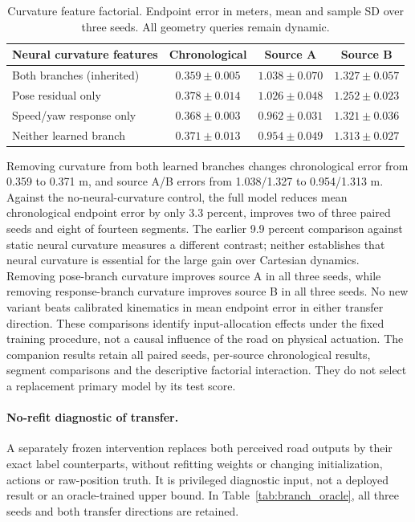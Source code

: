 \documentclass[preprint,12pt]{elsarticle}
\begin{document}
\begin{table}[htbp]
\centering\small
\caption{Curvature feature factorial. Endpoint error in meters, mean and sample SD over three seeds. All geometry queries remain dynamic.}
\label{tab:branch_factorial}
\begin{tabular}{lccc}\toprule
Neural curvature features & Chronological & Source A & Source B \\\midrule
Both branches (inherited) & $0.359 \pm 0.005$ & $1.038 \pm 0.070$ & $1.327 \pm 0.057$ \\
Pose residual only & $0.378 \pm 0.014$ & $1.026 \pm 0.048$ & $1.252 \pm 0.023$ \\
Speed/yaw response only & $0.368 \pm 0.003$ & $0.962 \pm 0.031$ & $1.321 \pm 0.036$ \\
Neither learned branch & $0.371 \pm 0.013$ & $0.954 \pm 0.049$ & $1.313 \pm 0.027$ \\
\bottomrule\end{tabular}
\end{table}

Removing curvature from both learned branches changes chronological error from 0.359 to 0.371 m, and source A/B errors from 1.038/1.327 to 0.954/1.313 m. Against the no-neural-curvature control, the full model reduces mean chronological
endpoint error by only 3.3 percent, improves two of three paired seeds and eight
of fourteen segments. The earlier 9.9 percent comparison against static neural
curvature measures a different contrast; neither establishes that neural
curvature is essential for the large gain over Cartesian dynamics. Removing
pose-branch curvature improves source A in all three seeds, while removing
response-branch curvature improves source B in all three seeds. No new variant
beats calibrated kinematics in mean endpoint error in either transfer direction.
These comparisons identify input-allocation effects under the fixed training
procedure, not a causal influence of the road on physical actuation. The
companion results retain all paired seeds, per-source chronological results,
segment comparisons and the descriptive factorial interaction. They do not
select a replacement primary model by its test score.

\paragraph{No-refit diagnostic of transfer.}
A separately frozen intervention replaces both perceived road outputs by their
exact label counterparts, without refitting weights or changing initialization,
actions or raw-position truth. It is privileged diagnostic input, not a deployed
result or an oracle-trained upper bound. In Table~\ref{tab:branch_oracle},
all three seeds and both transfer directions are retained.
\end{document}
